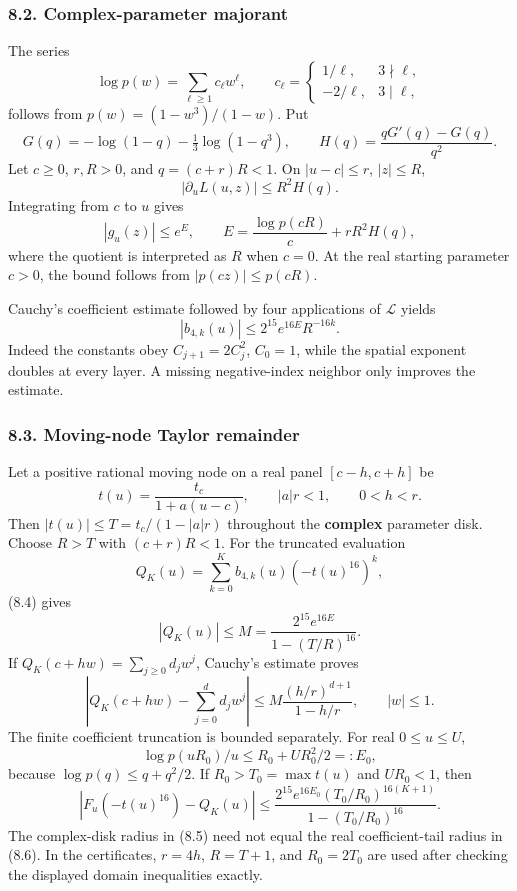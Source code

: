 \documentclass[
  11pt,
]{article}
\begin{document}
\subsubsection{8.2. Complex-parameter
majorant}\label{complex-parameter-majorant}

The series \[
 \log p(w)=\sum_{\ell\ge1}c_\ell w^\ell,\qquad
 c_\ell=\begin{cases}1/\ell,&3\nmid\ell,\\-2/\ell,&3\mid\ell,\end{cases}
\] follows from \(p(w)=(1-w^3)/(1-w)\). Put \[
 G(q)=-\log(1-q)-\tfrac13\log(1-q^3),
 \qquad H(q)=\frac{qG'(q)-G(q)}{q^2}.
\] Let \(c\ge0\), \(r,R>0\), and \(q=(c+r)R<1\). On \(|u-c|\le r\),
\(|z|\le R\), \[
 |\partial_uL(u,z)|\le R^2H(q).
\] Integrating from \(c\) to \(u\) gives \[
 |g_u(z)|\le e^E,\qquad
 E=\frac{\log p(cR)}c+rR^2H(q),                              \tag{8.3}
\] where the quotient is interpreted as \(R\) when \(c=0\). At the real
starting parameter \(c>0\), the bound follows from \(|p(cz)|\le p(cR)\).

Cauchy's coefficient estimate followed by four applications of
\(\mathcal L\) yields \[
 |b_{4,k}(u)|\le2^{15}e^{16E}R^{-16k}.                       \tag{8.4}
\] Indeed the constants obey \(C_{j+1}=2C_j^2\), \(C_0=1\), while the
spatial exponent doubles at every layer. A missing negative-index
neighbor only improves the estimate.

\subsubsection{8.3. Moving-node Taylor
remainder}\label{moving-node-taylor-remainder}

Let a positive rational moving node on a real panel \([c-h,c+h]\) be \[
 t(u)=\frac{t_c}{1+a(u-c)},\qquad |a|r<1,\qquad0<h<r.
\] Then \(|t(u)|\le T=t_c/(1-|a|r)\) throughout the \textbf{complex}
parameter disk. Choose \(R>T\) with \((c+r)R<1\). For the truncated
evaluation \[
 Q_K(u)=\sum_{k=0}^K b_{4,k}(u)(-t(u)^{16})^k,
\] (8.4) gives \[
 |Q_K(u)|\le M=\frac{2^{15}e^{16E}}{1-(T/R)^{16}}.
\] If \(Q_K(c+hw)=\sum_{j\ge0}d_jw^j\), Cauchy's estimate proves \[
 \left|Q_K(c+hw)-\sum_{j=0}^{d}d_jw^j\right|
 \le M\frac{(h/r)^{d+1}}{1-h/r},\qquad |w|\le1.              \tag{8.5}
\] The finite coefficient truncation is bounded separately. For real
\(0\le u\le U\), \[
 \log p(uR_0)/u\le R_0+UR_0^2/2=:E_0,
\] because \(\log p(q)\le q+q^2/2\). If \(R_0>T_0=\max t(u)\) and
\(UR_0<1\), then \[
 |F_u(-t(u)^{16})-Q_K(u)|
 \le\frac{2^{15}e^{16E_0}(T_0/R_0)^{16(K+1)}}
             {1-(T_0/R_0)^{16}}.                            \tag{8.6}
\] The complex-disk radius in (8.5) need not equal the real
coefficient-tail radius in (8.6). In the certificates, \(r=4h\),
\(R=T+1\), and \(R_0=2T_0\) are used after checking the displayed domain
inequalities exactly.
\end{document}
